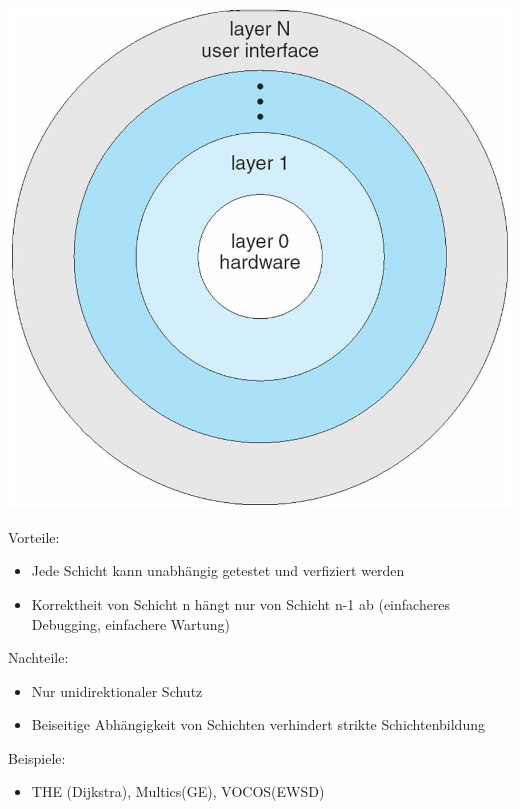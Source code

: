 \documentclass[a4paper]{scrreprt}
\begin{document}
\begin{center}
\includegraphics[scale=0.15]{graphics/schichtenmodell.png}
\end{center}

Vorteile:
	\begin{itemize}
		\item Jede Schicht kann unabhängig getestet und verfiziert werden
		\item Korrektheit von Schicht n hängt nur von Schicht n-1 ab (einfacheres Debugging, einfachere Wartung)
	\end{itemize}

Nachteile:
	\begin{itemize}
		\item Nur unidirektionaler Schutz
		\item Beiseitige Abhängigkeit von Schichten verhindert strikte Schichtenbildung
	\end{itemize}
Beispiele:
	\begin{itemize}
		\item THE (Dijkstra), Multics(GE), VOCOS(EWSD)
	\end{itemize}
	
\end{document}
